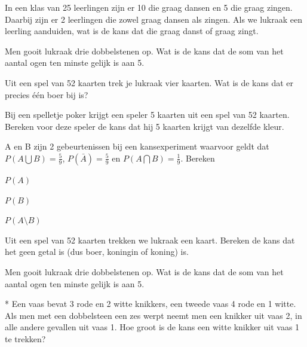 \documentclass[12pt,twoside]{article}
\begin{document}
\begin{oefening}
In een klas van 25 leerlingen zijn er 10 die graag dansen en 5 die graag
zingen. Daarbij zijn er 2 leerlingen die zowel graag dansen als zingen. Als we lukraak een
leerling aanduiden, wat is de kans dat die graag danst of graag zingt.
\end{oefening}

\begin{oefening}
Men gooit lukraak drie dobbelstenen op. Wat is de kans dat de som van
het aantal ogen ten minste gelijk is aan 5.
\end{oefening}

\begin{oefening}
Uit een spel van 52 kaarten trek je lukraak vier kaarten. Wat is de kans
dat er precies één boer bij is?
\end{oefening}

\begin{oefening}
Bij een spelletje poker krijgt een speler 5 kaarten uit een spel van 52
kaarten. Bereken voor deze speler de kans dat hij 5 kaarten krijgt van dezelfde kleur.
\end{oefening}

\begin{oefening}
A en B zijn 2 gebeurtenissen bij een kansexperiment waarvoor geldt dat $P(A\bigcup B)=\frac{5}{9}$, $P(\bar{A})=\frac{5}{9}$ en $P(A\bigcap B)=\frac{1}{9}$. Bereken
\begin{exlist}{3}
  \item $P(A)$
  \item $P(B)$
  \item $P(A\setminus B)$
\end{exlist}
\end{oefening}

\begin{oefening}
Uit een spel van 52 kaarten trekken we lukraak een kaart. Bereken de kans dat het geen getal is (dus boer, koningin of koning)  is.
\end{oefening}

\begin{oefening}
Men gooit lukraak drie dobbelstenen op. Wat is de kans dat de som van het aantal ogen ten minste gelijk is aan 5.
\end{oefening}

\begin{oefening}*
Een vaas bevat 3 rode en 2 witte knikkers, een tweede vaas 4 rode en 1 witte. Als men met een dobbelsteen een zes werpt neemt men een knikker uit vaas 2, in alle andere gevallen uit vaas 1. Hoe groot is de kans een witte knikker uit vaas 1 te trekken? 
\end{oefening}
\end{document}
